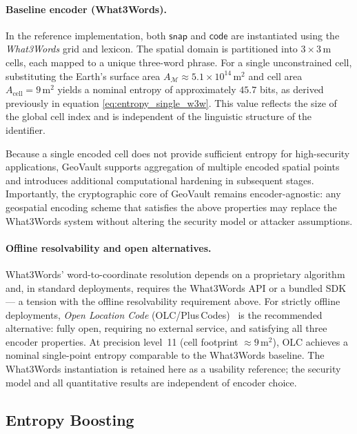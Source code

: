 \documentclass[journal,article,submit,pdftex,moreauthors]{Definitions/mdpi}
\newcommand{\add}[1]{#1}
\newcommand{\add}[1]{\added{#1}}
\begin{document}
\paragraph{Baseline encoder (What3Words).}
In the reference implementation, both $\mathsf{snap}$ and $\mathsf{code}$ are instantiated using the \emph{What3Words} grid and lexicon. The spatial domain is partitioned into $3 \times 3\,\mathrm{m}$ cells, each mapped to a unique three-word phrase. For a single unconstrained cell, substituting the Earth’s surface area $A_{\mathcal{M}} \approx 5.1 \times 10^{14}\,\mathrm{m}^2$ and cell area $A_{\mathrm{cell}} = 9\,\mathrm{m}^2$ yields a nominal entropy of approximately $45.7$ bits, as derived previously in equation \ref{eq:entropy_single_w3w}. This value reflects the size of the global cell index and is independent of the linguistic structure of the identifier.

Because a single encoded cell does not provide sufficient entropy for high-security applications, GeoVault supports aggregation of multiple encoded spatial points and introduces additional computational hardening in subsequent stages. Importantly, the cryptographic core of GeoVault remains encoder-agnostic: any geospatial encoding scheme that satisfies the above properties may replace the What3Words system without altering the security model or attacker assumptions.

\paragraph{\add{Offline resolvability and open alternatives.}} \add{What3Words' word-to-coordinate resolution depends on a proprietary algorithm and, in standard deployments, requires the What3Words API or a bundled SDK — a tension with the offline resolvability requirement above. For strictly offline deployments, \emph{Open Location Code} (OLC/Plus\,Codes)~\cite{Mai2022} is the recommended alternative: fully open, requiring no external service, and satisfying all three encoder properties. At precision level~11 (cell footprint $\approx 9\,\mathrm{m}^2$), OLC achieves a nominal single-point entropy comparable to the What3Words baseline. The What3Words instantiation is retained here as a usability reference; the security model and all quantitative results are independent of encoder choice.}

\subsection{Entropy Boosting}
\label{sec:entropy_boosting}
\end{document}
